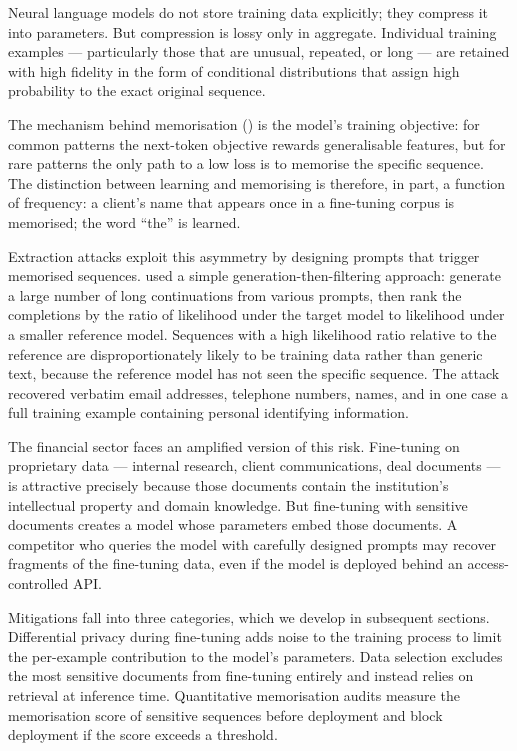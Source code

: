 Neural language models do not store training data explicitly; they compress it into parameters. But compression is lossy only in aggregate. Individual training examples — particularly those that are unusual, repeated, or long — are retained with high fidelity in the form of conditional distributions that assign high probability to the exact original sequence.

The mechanism behind memorisation () is the model's training
objective: for common patterns the next-token objective rewards generalisable features,
but for rare patterns the only path to a low loss is to memorise the specific sequence.
The distinction between learning and memorising is therefore, in part, a function of
frequency: a client's name that appears once in a fine-tuning corpus is memorised; the
word ``the'' is learned.

Extraction attacks exploit this asymmetry by designing prompts that trigger memorised sequences. \citet{carlini2021extracting} used a simple generation-then-filtering approach: generate a large number of long continuations from various prompts, then rank the completions by the ratio of likelihood under the target model to likelihood under a smaller reference model. Sequences with a high likelihood ratio relative to the reference are disproportionately likely to be training data rather than generic text, because the reference model has not seen the specific sequence. The attack recovered verbatim email addresses, telephone numbers, names, and in one case a full training example containing personal identifying information.

The financial sector faces an amplified version of this risk. Fine-tuning on proprietary data — internal research, client communications, deal documents — is attractive precisely because those documents contain the institution's intellectual property and domain knowledge. But fine-tuning with sensitive documents creates a model whose parameters embed those documents. A competitor who queries the model with carefully designed prompts may recover fragments of the fine-tuning data, even if the model is deployed behind an access-controlled API.

Mitigations fall into three categories, which we develop in subsequent sections. Differential privacy during fine-tuning adds noise to the training process to limit the per-example contribution to the model's parameters. Data selection excludes the most sensitive documents from fine-tuning entirely and instead relies on retrieval at inference time. Quantitative memorisation audits measure the memorisation score of sensitive sequences before deployment and block deployment if the score exceeds a threshold.

